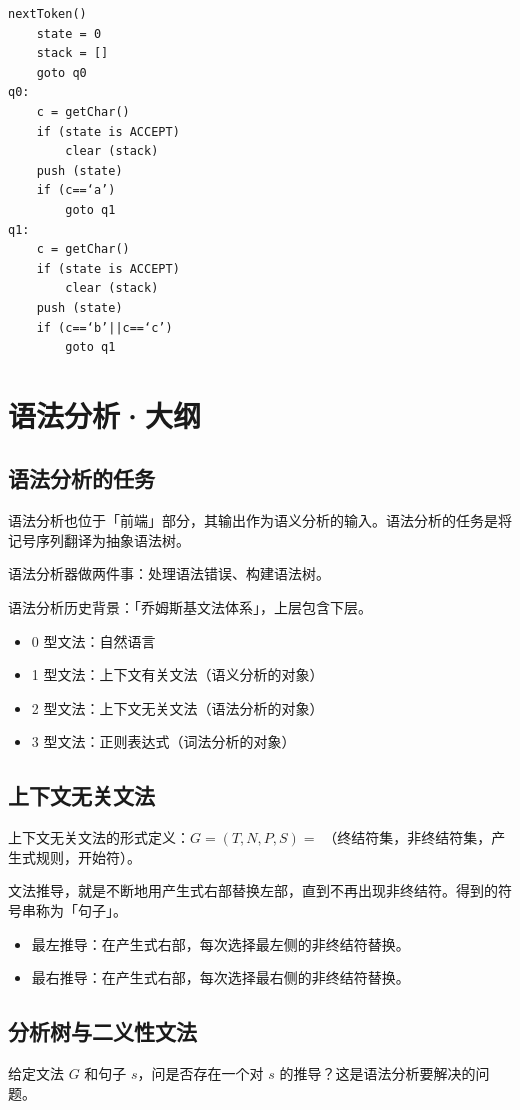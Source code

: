 \documentclass[UTF8]{ctexart}
\newcommand\Emph[1]{\textcolor{cyan!80!black}{#1}}
\begin{document}
\begin{lstlisting}
nextToken()
    state = 0
    stack = []
    goto q0
q0:
    c = getChar()
    if (state is ACCEPT)
        clear (stack)
    push (state)
    if (c==‘a’)
        goto q1
q1:
    c = getChar()
    if (state is ACCEPT)
        clear (stack)
    push (state)
    if (c==‘b’||c==‘c’)
        goto q1
\end{lstlisting}

\section{语法分析·大纲}
\subsection{语法分析的任务}
语法分析也位于「前端」部分，其输出作为语义分析的输入。语法分析的任务是将\Emph{记号序列}翻译为\Emph{抽象语法树}。

语法分析器做两件事：处理语法错误、构建语法树。

语法分析历史背景：「乔姆斯基文法体系」，上层包含下层。
\begin{itemize}[itemsep=0pt, parsep=0pt, leftmargin=1.5cm]
    \item 0 型文法：自然语言
    \item 1 型文法：上下文有关文法（语义分析的对象）
    \item 2 型文法：上下文无关文法（语法分析的对象）
    \item 3 型文法：正则表达式（词法分析的对象）
\end{itemize}

\subsection{上下文无关文法}
\Emph{上下文无关文法}的形式定义：$G = (T,N,P,S) =$ （终结符集，非终结符集，产生式规则，开始符）。

文法推导，就是不断地用产生式右部替换左部，直到不再出现非终结符。得到的符号串称为「句子」。
\begin{itemize}[itemsep=0pt, parsep=0pt, leftmargin=1.5cm]
    \item 最左推导：在产生式右部，每次选择\Emph{最左侧}的非终结符替换。
    \item 最右推导：在产生式右部，每次选择\Emph{最右侧}的非终结符替换。
\end{itemize}

\subsection{分析树与二义性文法}
给定文法 $G$ 和句子 $s$，问是否存在一个对 $s$ 的推导？这是语法分析要解决的问题。
\end{document}
